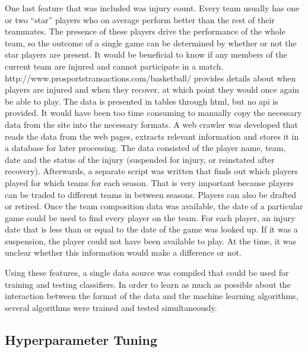 \documentclass{article}
\newcommand{\quotes}[1]{``#1''}
\begin{document}
One last feature that was included was injury count. Every team usually has one or two \quotes{star} players who on average perform better than the rest of their teammates. The presence of these players drive the performance of the whole team, so the outcome of a single game can be determined by whether or not the star players are present. It would be beneficial to know if any members of the current team are injured and cannot participate in a match. http://www.prosportstransactions.com/basketball/ provides details about when players are injured and when they recover, at which point they would once again be able to play. The data is presented in tables through html, but no api is provided. It would have been too time consuming to manually copy the necessary data from the site into the necessary formats. A web crawler was developed that reads the data from the web pages, extracts relevant information and stores it in a database for later processing. The data consisted of the player name, team, date and the status of the injury (suspended for injury, or reinstated after recovery). Afterwards, a separate script was written that finds out which players played for which teams for each season. That is very important because players can be traded to different teams in between seasons. Players can also be drafted or retired. Once the team composition data was available, the date of a particular game could be used to find every player on the team. For each player, an injury date that is less than or equal to the date of the game was looked up. If it was a suspension, the player could not have been available to play. At the time, it was unclear whether this information would make a difference or not.

Using these features, a single data source was compiled that could be used for training and testing classifiers. In order to learn as much as possible about the interaction between the format of the data and the machine learning algorithms, several algorithms were trained and tested simultaneously. 

\subsection {Hyperparameter Tuning}
\end{document}
